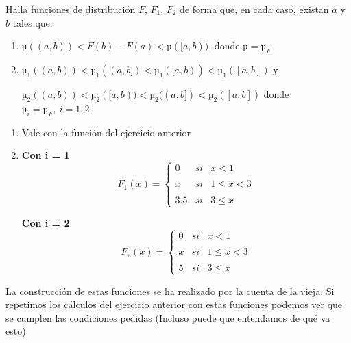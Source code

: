 \begin{problem}
Halla funciones de distribución $F$, $F_1$, $F_2$ de forma que, en cada caso, existan $a$ y $b$ tales que:
\begin{enumerate}
\item $µ((a,b)) < F(b)-F(a) < µ([a,b))$, donde $µ=µ_F$
\item $µ_1((a,b)) < µ_1((a,b]) < µ_1([a,b)) < µ_1([a,b])$ y

$µ_2((a,b)) < µ_2([a,b)) < µ_2((a,b]) < µ_2([a,b])$ donde $µ_i = µ_F, \ i=1,2$
\end{enumerate}
\solution
\begin{enumerate}
\item Vale con la función del ejercicio anterior
\item
\textbf{Con i = 1}
\[F_1(x)=\left\{ \begin{array}{lcc}
             0 &   si  & x < 1 \\
             \\ x & si & 1 \leq x < 3 \\
             \\ 3.5 &  si  & 3 \leq x
             \end{array}
   \right.\]

\textbf{Con i = 2}
\[F_2(x)=\left\{ \begin{array}{lcc}
             0 &   si  & x < 1 \\
             \\ x & si & 1 \leq x < 3 \\
             \\ 5 &  si  & 3 \leq x
             \end{array}
   \right.\]
\end{enumerate}

La construcción de estas funciones se ha realizado por la cuenta de la vieja. Si repetimos los cálculos del ejercicio anterior con estas funciones podemos ver que se cumplen las condiciones pedidas (Incluso puede que entendamos de qué va esto)
\end{problem}

